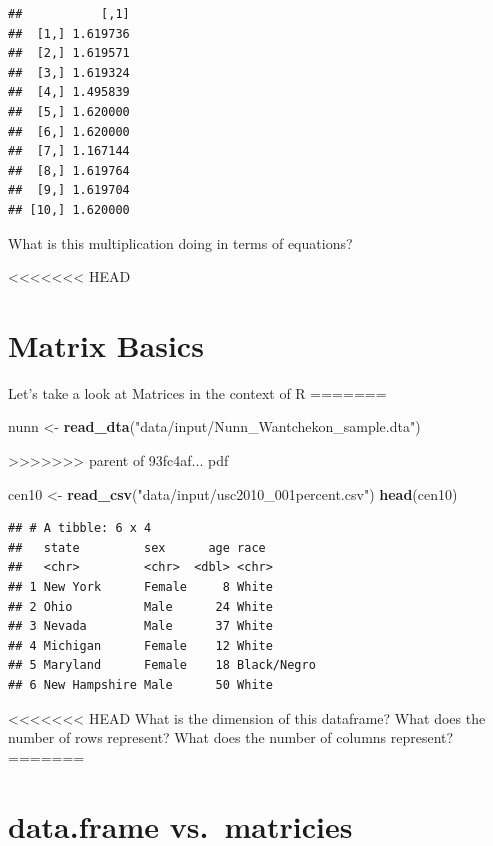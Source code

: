 \documentclass[]{book}
\newenvironment{Shaded}{\begin{snugshade}}{\end{snugshade}}
\newcommand{\KeywordTok}[1]{\textcolor[rgb]{0.13,0.29,0.53}{\textbf{#1}}}
\newcommand{\NormalTok}[1]{#1}
\newcommand{\StringTok}[1]{\textcolor[rgb]{0.31,0.60,0.02}{#1}}
\theoremstyle{definition}
\theoremstyle{definition}
\theoremstyle{definition}
\theoremstyle{remark}
\begin{document}
\begin{Shaded}
\begin{Highlighting}[]
\begin{Shaded}
\begin{Highlighting}[]
\begin{verbatim}
##           [,1]
##  [1,] 1.619736
##  [2,] 1.619571
##  [3,] 1.619324
##  [4,] 1.495839
##  [5,] 1.620000
##  [6,] 1.620000
##  [7,] 1.167144
##  [8,] 1.619764
##  [9,] 1.619704
## [10,] 1.620000
\end{verbatim}

What is this multiplication doing in terms of equations?

<<<<<<< HEAD
\hypertarget{matrix-basics}{%
\section{Matrix Basics}\label{matrix-basics}}

Let's take a look at Matrices in the context of R
=======
\begin{Shaded}
\begin{Highlighting}[]
\NormalTok{nunn <-}\StringTok{ }\KeywordTok{read_dta}\NormalTok{(}\StringTok{"data/input/Nunn_Wantchekon_sample.dta"}\NormalTok{)}
\end{Highlighting}
\end{Shaded}
>>>>>>> parent of 93fc4af... pdf

\begin{Shaded}
\begin{Highlighting}[]
\NormalTok{cen10 <{-}}\StringTok{ }\KeywordTok{read\_csv}\NormalTok{(}\StringTok{"data/input/usc2010\_001percent.csv"}\NormalTok{)}
\KeywordTok{head}\NormalTok{(cen10)}
\end{Highlighting}
\end{Shaded}

\begin{verbatim}
## # A tibble: 6 x 4
##   state         sex      age race       
##   <chr>         <chr>  <dbl> <chr>      
## 1 New York      Female     8 White      
## 2 Ohio          Male      24 White      
## 3 Nevada        Male      37 White      
## 4 Michigan      Female    12 White      
## 5 Maryland      Female    18 Black/Negro
## 6 New Hampshire Male      50 White
\end{verbatim}

<<<<<<< HEAD
What is the dimension of this dataframe? What does the number of rows represent? What does the number of columns represent?
=======
\hypertarget{data.frame-vs.matricies}{%
\section{data.frame vs.~matricies}\label{data.frame-vs.matricies}}


\end{Highlighting}
\end{Shaded}
\end{Highlighting}
\end{Shaded}
\end{document}
